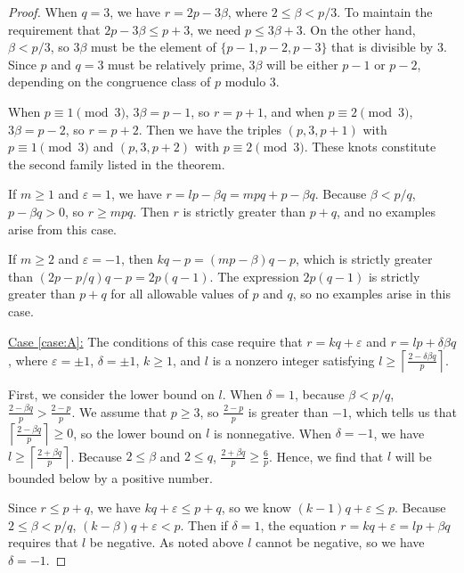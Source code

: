 \documentclass{amsart}
\newcommand{\eps}{\varepsilon}
\newcommand{\ds}{\displaystyle}
\begin{document}
\begin{proof}
When $q = 3$, we have $r = 2p - 3\beta $, where $2 \le \beta  <p/3$. To maintain the requirement that $2p- 3\beta \le p + 3$, we need $p \le 3\beta + 3$. On the other hand, $\beta < p/3$, so $3\beta$ must be the element of $\{p-1, p-2, p-3\}$ that is divisible by 3. Since $p$ and $q = 3$ must be relatively prime, $3\beta$ will be either $p-1$ or $p-2$, depending on the congruence class of $p$ modulo 3. 

When $p \equiv 1 \pmod 3$, $3 \beta = p-1$, so $r = p + 1$, and when $p \equiv 2 \pmod 3$, $3 \beta = p-2$, so $r = p + 2$. Then we have the triples $(p,3,p+1)$ with $p \equiv 1 \pmod 3$ and $(p,3,p+2)$ with $p \equiv 2 \pmod 3$. 
These knots constitute the second family listed in the theorem.

If $m \ge 1$ and $\eps = 1$,  we have $r = lp - \beta q = mpq + p - \beta q$. Because $\beta < p/q$, $p - \beta q >0$, so $r \ge mpq$. Then $r$ is strictly greater than $p+q$, and no examples arise from this case.

If $m \ge 2$ and $\eps = -1$, then $kq - p = (mp - \beta) q - p $, which is strictly greater than $(2p -p/q) q - p = 2p(q - 1)$. The expression $2p(q-1)$ is strictly greater than $p+q$ for all allowable values of $p$ and $q$, so no examples arise in this case.



\underline{Case \ref{case:A}:} The conditions of this case require that $r = kq + \eps$ and $ r  = lp + \delta \beta q$, where $\eps = \pm 1$, $\delta = \pm 1$, $k \ge 1$, and $l$ is a nonzero integer satisfying $\ds l \ge \left\lceil \frac{2-\delta\beta q}{p}\right\rceil$.

First, we consider the lower bound on $l$. When $\delta = 1$, because $\beta < p/q$, $\frac{2-\beta q}{p} > \frac{2-p}{p}$. We assume that $p\ge 3$, so $\frac{2-p}{p}$ is greater than $-1$, which tells us that $\left\lceil \frac{2-\beta q}{p}\right\rceil \ge 0$, so the lower bound on $l$ is nonnegative. When $\delta = -1$, we have $l \ge \left\lceil \frac{2+\beta q}{p}\right\rceil$. Because $2 \le \beta$ and $2\le q$, $\frac{2 + \beta q}{p} \ge \frac{6}{p}$. Hence, we find that $l$ will be bounded below by a positive number.

Since $r\le p+q$, we have $kq + \eps \le p+q$, so we know $ (k-1)q + \eps \le p$. Because $2 \le \beta < p/q$,  $ (k-\beta) q + \eps < p$. Then if $\delta = 1$, the equation $r = kq + \eps = lp +\beta q$ requires that $l$ be negative. As noted above $l$ cannot be negative, so we have $\delta = -1$.


\end{proof}
\end{document}
